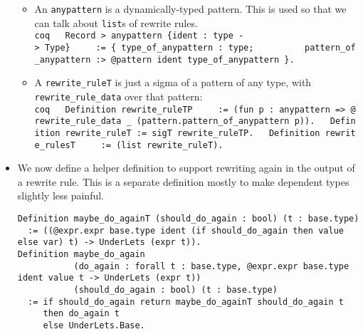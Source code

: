 \begin{itemize}
  \begin{itemize}
  \tightlist
  \item
    An \texttt{anypattern} is a dynamically-typed pattern. This is used
    so that we can talk about \texttt{list}s of rewrite rules.
    \texttt{coq\ \ \ Record\ \textgreater{}\ anypattern\ \{ident\ :\ type\ -\textgreater{}\ Type\}\ \ \ ~\ :=\ \{\ type\_of\_anypattern\ :\ type;\ \ \ ~\ ~\ ~\ ~pattern\_of\_anypattern\ :\textgreater{}\ @pattern\ ident\ type\_of\_anypattern\ \}.}
  \item
    A \texttt{rewrite\_ruleT} is just a sigma of a pattern of any type,
    with \texttt{rewrite\_rule\_data} over that pattern:
    \texttt{coq\ \ \ Definition\ rewrite\_ruleTP\ \ \ ~\ :=\ (fun\ p\ :\ anypattern\ =\textgreater{}\ @rewrite\_rule\_data\ \_\ (pattern.pattern\_of\_anypattern\ p)).\ \ \ Definition\ rewrite\_ruleT\ :=\ sigT\ rewrite\_ruleTP.\ \ \ Definition\ rewrite\_rulesT\ \ \ ~\ :=\ (list\ rewrite\_ruleT).}
  \end{itemize}
\item
  We now define a helper definition to support rewriting again in the
  output of a rewrite rule. This is a separate definition mostly to make
  dependent types slightly less painful.

\begin{verbatim}
Definition maybe_do_againT (should_do_again : bool) (t : base.type)
  := ((@expr.expr base.type ident (if should_do_again then value else var) t) -> UnderLets (expr t)).
Definition maybe_do_again
           (do_again : forall t : base.type, @expr.expr base.type ident value t -> UnderLets (expr t))
           (should_do_again : bool) (t : base.type)
  := if should_do_again return maybe_do_againT should_do_again t
     then do_again t
     else UnderLets.Base.
\end{verbatim}


\end{itemize}
